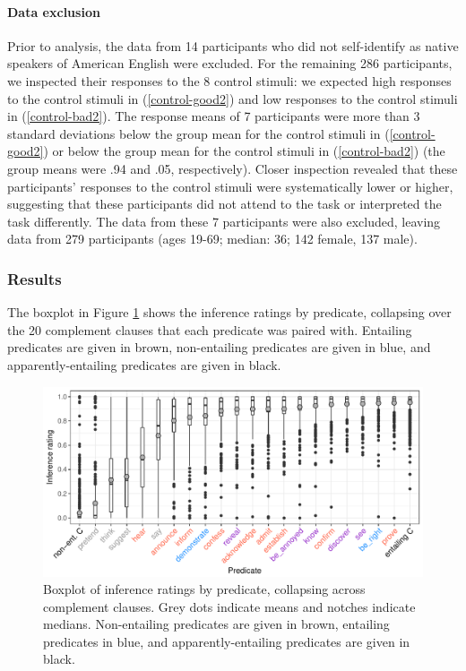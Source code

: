 \documentclass[11pt,fleqn]{article}
\newcommand{\6}{\mbox{$[\hspace*{-.6mm}[$}}
\newcommand{\9}{\mbox{$]\hspace*{-.6mm}]$}}
\begin{document}
\paragraph{Data exclusion}
Prior to analysis, the data from 14 participants who did not self-identify as native speakers of American English were excluded. For the remaining 286 participants, we inspected their responses to the 8 control stimuli: we expected high responses to the control stimuli in (\ref{control-good2}) and low responses to the control stimuli in (\ref{control-bad2}). The response means of 7 participants were more than 3 standard deviations below the group mean for the control stimuli in (\ref{control-good2}) or below the group mean for the control stimuli in (\ref{control-bad2}) (the group means were .94 and .05, respectively). Closer inspection revealed that these participants' responses to the control stimuli were systematically lower or higher, suggesting that these participants did not attend to the task or interpreted the task differently. The data from these 7 participants were also excluded, leaving data from 279 participants (ages 19-69; median: 36; 142 female, 137 male).

\subsubsection{Results}

The boxplot in Figure \ref{f-veridicality-predicate2} shows the inference ratings by predicate, collapsing over the 20 complement clauses that each predicate was paired with. Entailing predicates are given in brown, non-entailing predicates are given in blue, and apparently-entailing predicates are given in black.

\begin{figure}[h!]
\centering

\includegraphics[width=.8\paperwidth]{../results/4-veridicality3/graphs/boxplot-inference}

\caption{Boxplot of inference ratings by predicate, collapsing across complement clauses. Grey dots indicate means and notches indicate medians. Non-entailing predicates are given in brown, entailing predicates in blue, and apparently-entailing predicates are given in black.}
\label{f-veridicality-predicate2}
\end{figure}
\end{document}
